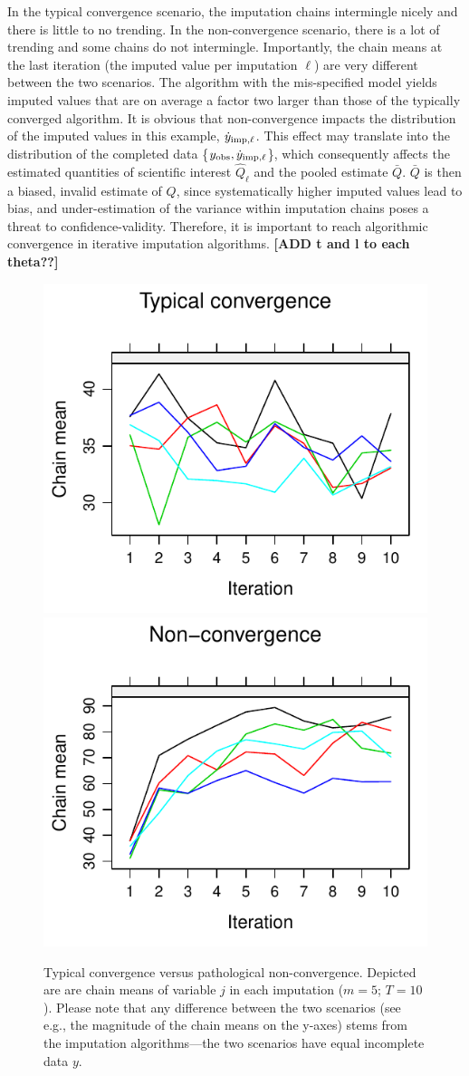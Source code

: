 \documentclass[Royal,times,sageh]{sagej}
\begin{document}
In the typical convergence scenario, the imputation chains intermingle nicely and there is little to no trending. In the non-convergence scenario, there is a lot of trending and some chains do not intermingle. Importantly, the chain means at the last iteration (the imputed value per imputation \(\ell\)) are very different between the two scenarios. The algorithm with the mis-specified model yields imputed values that are on average a factor two larger than those of the typically converged algorithm. It is obvious that non-convergence impacts the distribution of the imputed values in this example, \(\dot y_{\rm imp, \ell}\). This effect may translate into the distribution of the completed data \{\(y_{\rm obs}, \dot y_{\rm imp, \ell}\)\}, which consequently affects the estimated quantities of scientific interest \(\hat{Q}_{\ell}\) and the pooled estimate \(\bar{Q}\). \(\bar{Q}\) is then a biased, invalid estimate of \(Q\), since systematically higher imputed values lead to bias, and under-estimation of the variance within imputation chains poses a threat to confidence-validity. Therefore, it is important to reach algorithmic convergence in iterative imputation algorithms. \textbf{{[}ADD t and l to each theta??{]}}

\begin{figure}

{\centering \includegraphics[width=.49\linewidth]{2.Manuscript_files/figure-latex/non-conv-1} \includegraphics[width=.49\linewidth]{2.Manuscript_files/figure-latex/non-conv-2} 

}

\caption{Typical convergence versus pathological non-convergence. Depicted are are chain means of variable $j$ in each imputation ($m=5$; $T=10$). Please note that any difference between the two scenarios (see e.g., the magnitude of the chain means on the y-axes) stems from the imputation algorithms---the two scenarios have equal incomplete data $y$.}\label{fig:non-conv}
\end{figure}
\end{document}
